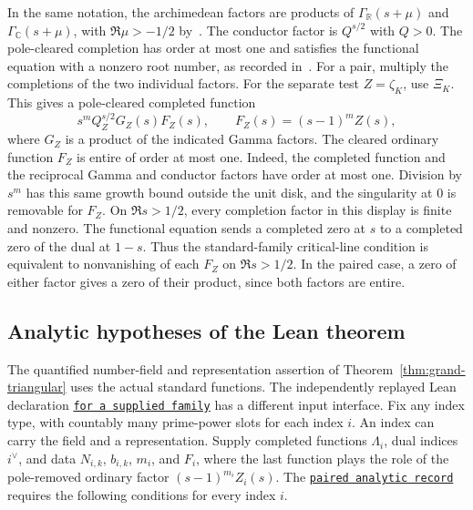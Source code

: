 \documentclass[11pt]{amsart}
\theoremstyle{definition}
\theoremstyle{remark}
\numberwithin{equation}{section}
\newcommand{\repositoryurl}{https://github.com/kimihiro64/Robin1984}
\newcommand{\proofrevision}{b359826e62c50b6cef55db4b2fcab793232498cc}
\newcommand{\codelink}[2]{%
  \href{\repositoryurl/blob/\proofrevision/#1}{\texttt{#2}}}
\begin{document}
In the same notation, the archimedean factors are products of
\(\Gamma_{\mathbb R}(s+\mu)\) and \(\Gamma_{\mathbb C}(s+\mu)\),
with \(\Re\mu>-1/2\) by~\cite[(2.2)]{ThornerZhaoRankinSelberg}.
The conductor factor is \(Q^{s/2}\) with \(Q>0\).
The pole-cleared completion has order at most one and satisfies
the functional equation with a nonzero root number,
as recorded in~\cite[\S\,2.1]{ThornerZhaoRankinSelberg}.
For a pair, multiply the completions of the two individual factors.
For the separate test \(Z=\zeta_K\), use \(\Xi_K\). This gives a
pole-cleared completed function
\[
 s^m Q_Z^{s/2}G_Z(s)F_Z(s),\qquad F_Z(s)=(s-1)^m Z(s),
\]
where \(G_Z\) is a product of the indicated Gamma factors.
The cleared ordinary function \(F_Z\) is entire of order at most
one. Indeed, the completed function and the reciprocal Gamma and
conductor factors have order at most one. Division by \(s^m\)
has this same growth bound outside the unit disk, and the
singularity at \(0\) is removable for \(F_Z\).
On \(\Re s>1/2\), every completion factor in this display is
finite and nonzero. The functional equation sends a completed
zero at \(s\) to a completed zero of the dual at \(1-s\). Thus
the standard-family critical-line condition is equivalent to
nonvanishing of each \(F_Z\) on \(\Re s>1/2\). In the paired case,
a zero of either factor
gives a zero of their product, since both factors are entire.

\subsection{Analytic hypotheses of the Lean theorem}
\label{sec:lean-analytic-interface}

The quantified number-field and representation assertion of
Theorem~\ref{thm:grand-triangular} uses the actual standard
functions. The independently replayed Lean declaration
\codelink{Challenge.lean\#L259-L264}{for a supplied family}
has a different input interface. Fix any index type, with
countably many prime-power slots for each index \(i\). An index
can carry the field and a representation. Supply completed
functions \(\Lambda_i\), dual indices \(i^\vee\), and data
\(N_{i,k}\), \(b_{i,k}\), \(m_i\), and \(F_i\), where the last
function plays the role of the pole-removed ordinary factor
\((s-1)^{m_i}Z_i(s)\). The \codelink{Challenge.lean\#L162-L183}{paired analytic record}
requires the following conditions for every index \(i\).
\end{document}
